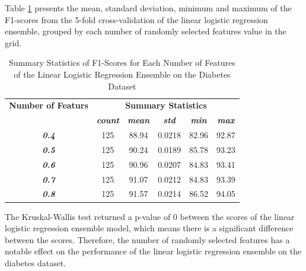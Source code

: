 \documentclass[10pt, conference]{IEEEtran}
\begin{document}
Table \ref{table: D_features_linear_performance_metrics} presents the mean, standard deviation, minimum and maximum of the
F1-scores from the 5-fold cross-validation of the linear logistic regression ensemble, grouped by each number of randomly selected
features value in the grid.
\begin{table}[H]
    \caption{Summary Statistics of F1-Scores for Each Number of Features of the Linear Logistic Regression Ensemble on the Diabetes Dataset}
    \begin{center}
        \begin{tabular}{|c||c|c|c|c|c|}
            \hline
            \textbf{Number of Featurs}&\multicolumn{5}{|c|}{\textbf{Summary Statistics}} \\
            \cline{2-6}
                       &\textbf{\textit{count}} & \textbf{\textit{mean}} & \textbf{\textit{std}} & \textbf{\textit{min}} & \textbf{\textit{max}}\\
            \hline
            \textbf{\textit{0.4}} & 125 & 88.94 & 0.0218 & 82.96 & 92.87 \\
            \textbf{\textit{0.5}} & 125 & 90.24 & 0.0189 & 85.78 & 93.23 \\
            \textbf{\textit{0.6}} & 125 & 90.96 & 0.0207 & 84.83 & 93.41 \\
            \textbf{\textit{0.7}} & 125 & 91.07 & 0.0212 & 84.83 & 93.39 \\
            \textbf{\textit{0.8}} & 125 & 91.57 & 0.0214 & 86.52 & 94.05 \\
            \hline
        \end{tabular}
    \end{center}
    \label{table: D_features_linear_performance_metrics}
\end{table}
The Kruskal-Wallis test returned a p-value of 0 between the scores of the linear logistic regression ensemble model,
which means there is a significant difference between the scores. Therefore, the number of randomly selected
features has a notable effect on the performance of the linear logistic regression ensemble on the diabetes dataset.
\end{document}
